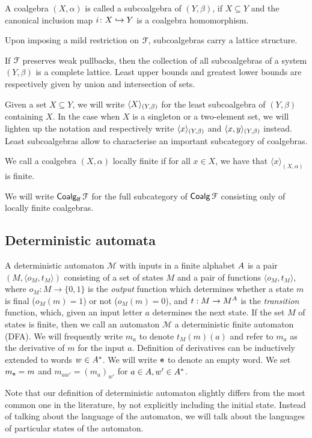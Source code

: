 \begin{definition}\label{c2:def:subcoalgebra}
A coalgebra $(X, \alpha)$ is called a subcoalgebra of $(Y, \beta)$, if $X \subseteq Y$ and the canonical inclusion map $i \colon X \hookrightarrow Y$ is a coalgebra homomorphism.	
\end{definition}
Upon imposing a mild restriction on $\mathcal{F}$, subcoalgebras carry a lattice structure.
\begin{lemma}\label{c2:lem:subcoalgebras_lattice}
If $\mathcal{F}$ preserves weak pullbacks, then the collection of all subcoalgebras of a system $(Y, \beta)$ is a complete lattice. Least upper bounds and greatest lower bounds are respectively given by union and intersection of sets. 
\end{lemma}
Given a set $X \subseteq Y$, we will write $\langle X \rangle_{(Y, \beta)}$ for the least subcoalgebra of $(Y, \beta)$ containing $X$.	
In the case when $X$ is a singleton or a two-element set, we will lighten up the notation and respectively write $\langle x \rangle_{(Y, \beta)}$ and $\langle x,y \rangle_{(Y, \beta)}$ instead. Least subcoalgebras allow to characterise an important subcategory of coalgebras.
\begin{definition}\label{c2:def:locally_finite}
We call a coalgebra $(X, \alpha)$ locally finite if for all $x \in X$, we have that $\langle x \rangle_{(X, \alpha)}$ is finite.		
\end{definition}
We will write $\mathop{\mathsf{Coalg}_{\mathsf{lf}}}{\mathcal{F}}$ for the full subcategory of $\mathop{\mathsf{Coalg}}{\mathcal{F}}$ consisting only of locally finite coalgebras.
\subsection{Deterministic automata}\label{c2:subsec:deterministic_automata}
A deterministic automaton $\mathcal{M}$ with inputs in a finite alphabet ${A}$ is a pair $(M, \langle o_M , t_M \rangle)$ consisting of a set of states $M$ and a pair of functions $\langle o_M, t_M \rangle$, where $o_M \colon M \to \{0,1\}$ is the \emph{output} function which determines whether a state $m$ is final ($o_M(m)=1$) or not ($o_M(m)=0$), and $t :M \to M^{A}$ is the \emph{transition} function, which, given an input letter $a$ determines the next state. If the set $M$ of states is finite, then we call an automaton $\mathcal{M}$ a deterministic finite automaton (DFA). We will frequently write $m_a$ to denote $t_M(m)(a)$ and refer to $m_a$ as the derivative of $m$ for the input $a$. Definition of derivatives can be inductively extended to words $w \in {A}^{\ast}$. We will write $\mathtt{e}$ to denote an empty word. We set $m_{\mathtt{e}} = m$ and $m_{aw'} = (m_a)_{w'}$ for $a \in {A}, w' \in {A}^\ast$.
\begin{remark}\label{c2:rem:automata_as_coalgebras}
Note that our definition of deterministic automaton slightly differs from the most common one in the literature, by not explicitly including the initial state. Instead of talking about the language of the automaton, we will talk about the languages of particular states of the automaton. 	
\end{remark}


